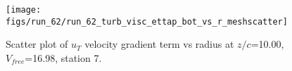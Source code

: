 \begin{figure}[H]
\centering
\texttt{[image: figs/run\_62/run\_62\_turb\_visc\_ettap\_bot\_vs\_r\_meshscatter]}
\caption{Scatter plot of $
u_T$ velocity gradient term vs radius at $z/c$=10.00, $V_{free}$=16.98, station 7.}
\end{figure}


